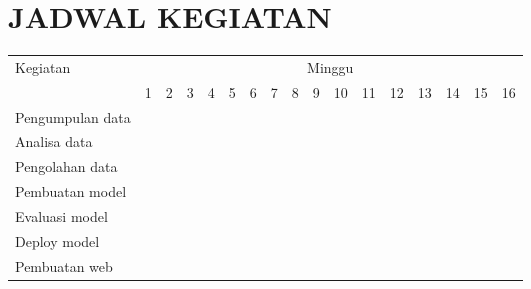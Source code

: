 \chapter*{JADWAL KEGIATAN}
\newcommand{\w}{}
\newcommand{\G}{\cellcolor{gray}}
\begin{table}[h!]
    \begin{tabular}{|p{3.5cm}|c|c|c|c|c|c|c|c|c|c|c|c|c|c|c|c|}

        \hline
        \multirow{2}{*}{Kegiatan} & \multicolumn{16}{|c|}{Minggu}                                                                       \\
        \cline{2-17}              &
        1                         & 2                             & 3  & 4  & 5  & 6  & 7  & 8  & 9  & 10 & 11 & 12 & 13 & 14 & 15 & 16 \\
        \hline

        Pengumpulan data          &
        \G                        & \G                            & \G & \G & \w & \w & \w & \w & \w & \w & \w & \w & \w & \w & \w & \w \\
        \hline

        Analisa data              &
        \w                        & \w                            & \w & \w & \G & \G & \w & \w & \w & \w & \w & \w & \w & \w & \w & \w \\
        \hline

        Pengolahan data           &
        \w                        & \w                            & \w & \w & \w & \G & \G & \w & \w & \w & \w & \w & \w & \w & \w & \w \\
        \hline

        Pembuatan model           &
        \w                        & \w                            & \w & \w & \w & \w & \w & \G & \G & \G & \G & \w & \w & \w & \w & \w \\
        \hline

        Evaluasi model            &
        \w                        & \w                            & \w & \w & \w & \w & \w & \w & \w & \w & \G & \G & \G & \G & \w & \w \\
        \hline

        Deploy model              &
        \w                        & \w                            & \w & \w & \w & \w & \w & \w & \w & \w & \w & \w & \w & \G & \G & \w \\
        \hline

        Pembuatan web             &
        \w                        & \w                            & \w & \w & \w & \w & \w & \w & \w & \w & \w & \w & \w & \w & \G & \G \\
        \hline
    \end{tabular}
\end{table}